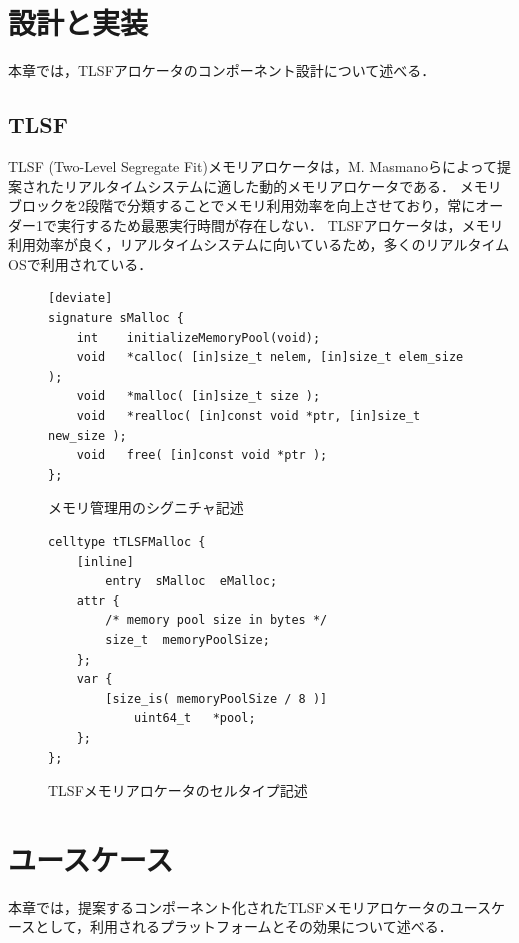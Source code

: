 \documentclass[submit]{ipsj_v2/UTF8/ipsj}
\begin{document}
\section{設計と実装}
\label{sec:DesignImplementation}

本章では，TLSFアロケータのコンポーネント設計について述べる．


\subsection{TLSF}
\label{sec:TLSF}
TLSF (Two-Level Segregate Fit)メモリアロケータは，M. Masmanoらによって提案されたリアルタイムシステムに適した動的メモリアロケータである．
メモリブロックを2段階で分類することでメモリ利用効率を向上させており，常にオーダー1で実行するため最悪実行時間が存在しない．
TLSFアロケータは，メモリ利用効率が良く，リアルタイムシステムに向いているため，多くのリアルタイムOSで利用されている．



\begin{figure}[t]
\centering
\begin{lstlisting}
[deviate]
signature sMalloc {
    int    initializeMemoryPool(void);
    void   *calloc( [in]size_t nelem, [in]size_t elem_size );
    void   *malloc( [in]size_t size );
    void   *realloc( [in]const void *ptr, [in]size_t new_size );
    void   free( [in]const void *ptr );
};
\end{lstlisting}
\caption{メモリ管理用のシグニチャ記述}  
\label{src:TLSFSignature}
\end{figure}

\begin{figure}[t]
\centering
\begin{lstlisting}
celltype tTLSFMalloc {
    [inline]
        entry  sMalloc  eMalloc;
    attr {
        /* memory pool size in bytes */
        size_t  memoryPoolSize;
    };
    var {
        [size_is( memoryPoolSize / 8 )]
            uint64_t   *pool;
    };
};
\end{lstlisting}
\caption{TLSFメモリアロケータのセルタイプ記述}  
\label{src:TLSFCelltype}
\end{figure}

\section{ユースケース}
\label{sec:UseCase}

本章では，提案するコンポーネント化されたTLSFメモリアロケータのユースケースとして，利用されるプラットフォームとその効果について述べる．
\end{document}
